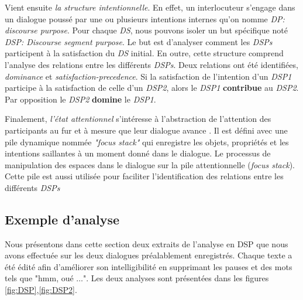 Vient ensuite \emph{la structure intentionnelle}. En effet, un interlocuteur s'engage dans un dialogue poussé par une ou plusieurs intentions internes qu'on nomme \emph{DP: discourse purpose}. Pour chaque \emph{DS}, nous pouvons isoler un but spécifique noté \emph{DSP: Discourse segment purpose}. Le but est d'analyser comment les\emph{ DSPs} participent à la satisfaction du \emph{DS} initial. En outre, cette structure comprend l'analyse des relations entre les différents \emph{DSPs}. Deux relations ont été identifiées, \emph{dominance} et \emph{satisfaction-precedence}. Si la satisfaction de l'intention d'un \emph{DSP1} participe à la satisfaction de celle d'un \emph{DSP2}, alors le \emph{DSP1} \textbf{contribue} au \emph{DSP2}. Par opposition le \emph{DSP2} \textbf{domine} le \emph{DSP1}.


Finalement, \emph{l'état attentionnel} s'intéresse à l'abstraction de l'attention des participants au fur et à mesure que leur dialogue avance \cite{sidner1994artificial}. Il est défini avec une pile dynamique nommée \emph{"focus stack"} qui enregistre les objets, propriétés et les intentions saillantes  à un moment donné dans le dialogue. Le processus de manipulation des espaces dans le dialogue sur la pile attentionnelle (\emph{focus stack}). Cette pile est aussi utilisée pour faciliter l'identification des relations entre les différents \emph{DSPs}


\subsection{Exemple d'analyse}
Nous présentons dans cette section deux extraits de l'analyse en DSP que nous avons effectuée sur les deux dialogues préalablement enregistrés. Chaque texte a été édité afin d'améliorer son intelligibilité en supprimant les pauses et des mots tels que "hmm, oué $\ldots$".
Les deux analyses sont présentées dans les figures \ref{fig:DSP},\ref{fig:DSP2}.


